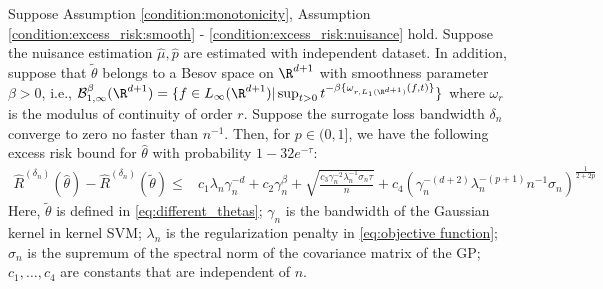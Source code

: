 \begin{lemma}\label{lemma:svm_estimation_error_cross_fitting}
    Suppose Assumption \ref{condition:monotonicity}, Assumption \ref{condition:excess_risk:smooth} - \ref{condition:excess_risk:nuisance} hold. Suppose the nuisance estimation $\widehat\mu, \widehat p$ are estimated with independent dataset. In addition, suppose that $\tilde\theta$ belongs to a Besov space on $\R^{d+1}$ with smoothness parameter $\beta>0$, i.e., $\mathcal{B}_{1,\infty}^\beta(\R^{d+1}) = \{f\in L_\infty(\R^{d+1})|\sup_{t>0}t^{-\beta\{\omega_{r,L_1(\R^{d+1})}(f,t)\}}\}$ where $\omega_r$ is the modulus of continuity of order $r$. Suppose the surrogate loss bandwidth $\delta_n$ converge to zero no faster than $n^{-1}$. Then, for $p\in(0,1]$, we have the following excess risk bound for $\widehat\theta$ with probability $1-32e^{-\tau}$:
   \begin{align*}
  \widehat R^{({\delta_n})}(\widehat\theta) - \widehat R^{({\delta_n})}(\tilde\theta)\leq & c_1 \lambda_n\gamma_n^{-d} + c_2\gamma_n^{\beta}+ \sqrt{\frac{ c_3\gamma_n^{-2}\lambda_n^{-1}\sigma_n\tau}{n}} + c_4\left(\gamma_n^{-(d+2)}\lambda_n^{-(p+1)}n^{-1}\sigma_n\right)^{\frac{1}{2+2p}} 
\end{align*}
Here, $\tilde\theta$ is defined in \eqref{eq:different_thetas}; $\gamma_n$ is the bandwidth of the Gaussian kernel in kernel SVM; $\lambda_n$ is the regularization penalty in \eqref{eq:objective function}; $\sigma_n$ is the supremum of the spectral norm of the covariance matrix of the GP; $c_1,\ldots,c_4$ are constants that are independent of $n$.    
\end{lemma}

